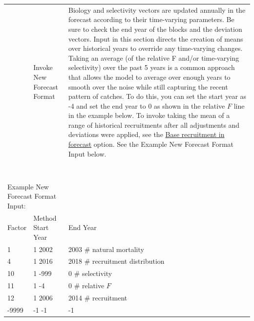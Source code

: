\begin{landscape}
{\begin{longtable}{p{2cm} p{7cm} p{12cm}}
  \pagebreak
  -12345 & Invoke New Forecast Format & \multirow{1}{1cm}[-0.15cm]{\parbox{12cm}{Biology and selectivity vectors are updated annually in the forecast according to their time-varying parameters. Be sure to check the end year of the blocks and the deviation vectors. Input in this section directs the creation of means over historical years to override any time-varying changes. Taking an average (of the relative F and/or time-varying selectivity) over the past 5 years is a common approach that allows the model to average over enough years to smooth over the noise while still capturing the recent pattern of catches. To do this, you can set the start year as -4 and set the end year to 0 as shown in the relative $F$ line in the example below. To invoke taking the mean of a range of historical recruitments after all adjustments and deviations were applied, see the \hyperlink{FcastRecruitment}{Base recruitment in forecast} option. See the Example New Forecast Format Input below.}} \Tstrut\Bstrut\\
   & & \\
   & & \\
   & & \\
   & & \Bstrut\\
   & & \Tstrut\Bstrut\\
   & & \Tstrut\Bstrut\\
   & & \Tstrut\Bstrut\\
   & & \Tstrut\Bstrut\\
  
  \multicolumn{2}{l}{Example New Forecast Format Input:} & \\
  Factor & Method \hspace{15mm} Start Year & End Year \\
  1 & 1 \hspace{26mm} 2002 & 2003 \hspace{24mm} \# natural mortality \\
  4 & 1 \hspace{26mm} 2016 & 2018 \hspace{24mm} \# recruitment distribution \\ 
  10 & 1 \hspace{26mm} -999 & 0 \hspace{30mm} \# selectivity \\
  11 & 1 \hspace{26mm} -4 & 0 \hspace{30mm} \# relative $F$\\
  12 & 1 \hspace{26mm} 2006 & 2014 \hspace{24mm} \# recruitment\\
  -9999 & -1 \hspace{25mm} -1 & -1 \Bstrut\\


\end{longtable}}
\end{landscape}
